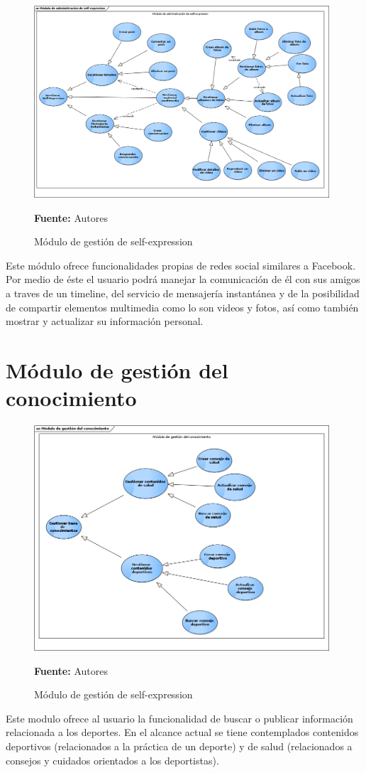 \begin{figure}[!htb]
  \begin{center}
    \includegraphics[width=11cm]{./imagenes/casos_uso/gestion_self_sharing.png}
    \caption{Módulo de gestión de self-expression}
    \label{fig:cu_self_shar}
    \textbf{Fuente:} Autores
  \end{center}
\end{figure}

Este módulo ofrece funcionalidades propias de redes social similares a Facebook. Por medio de éste el usuario podrá manejar la comunicación de él con sus amigos a traves de un timeline, del servicio de mensajería instantánea y de la posibilidad de compartir elementos multimedia como lo son videos y fotos, así como también mostrar y actualizar su información personal.

\section{Módulo de gestión del conocimiento}

\begin{figure}[!htb]
  \begin{center}
    \includegraphics[width=11cm]{./imagenes/casos_uso/gestion_conocimiento.png}
    \caption{Módulo de gestión de self-expression}
    \label{fig:cu_self_shar}
    \textbf{Fuente:} Autores
  \end{center}
\end{figure}

Este modulo ofrece al usuario la funcionalidad de buscar o publicar información relacionada a los deportes. En el alcance actual se tiene contemplados contenidos deportivos (relacionados a la práctica de un deporte) y de salud (relacionados a consejos y cuidados orientados a los deportistas).